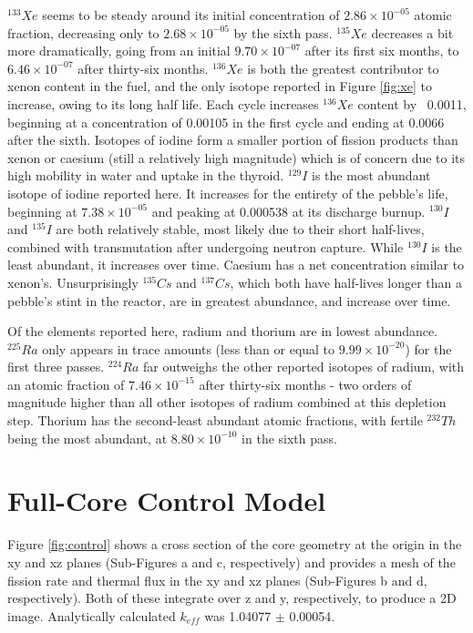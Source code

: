 $^{133}Xe$ seems to be steady around its initial concentration of $2.86\times10^{-05}$ atomic fraction, decreasing only to $2.68\times10^{-05}$ by the sixth pass.  $^{135}Xe$ decreases a bit more dramatically, going from an initial $9.70\times10^{-07}$ after its first six months, to  $6.46\times10^{-07}$ after thirty-six months.  $^{136}Xe$ is both the greatest contributor to xenon content in the fuel, and the only isotope reported in  Figure \ref{fig:xe} to increase, owing to its long half life.  Each cycle increases $^{136}Xe$ content by ~0.0011, beginning at a concentration of 0.00105 in the first cycle and ending at 0.0066 after the sixth.  Isotopes of iodine form a smaller portion of fission products than xenon or caesium (still a relatively high magnitude) which is of concern due to its high mobility in water and uptake in the thyroid.  $^{129}I$ is the most abundant isotope of iodine reported here.  It increases for the entirety of the pebble's life, beginning at $7.38\times10^{-05}$ and peaking at 0.000538 at its discharge burnup.  $^{130}I$ and $^{135}I$ are both relatively stable, most likely due to their short half-lives, combined with transmutation after undergoing neutron capture.  While $^{130}I$ is the least abundant, it increases over time.  Caesium has a net concentration similar to xenon's.  Unsurprisingly $^{135}Cs$ and $^{137}Cs$, which both have half-lives longer than a pebble's stint in the reactor, are in greatest abundance, and increase over time.

Of the elements reported here, radium and thorium are in lowest abundance.  $^{225}Ra$ only appears in trace amounts (less than or equal to $9.99\times10^{-20}$) for the first three passes.  $^{224}Ra$ far outweighs the other reported isotopes of radium, with an atomic fraction of $7.46\times10^{-15}$ after thirty-six months - two orders of magnitude higher than all other isotopes of radium combined at this depletion step.  Thorium has the second-least abundant atomic fractions, with fertile $^{232}Th$ being the most abundant, at $8.80\times10^{-10}$ in the sixth pass.

\section{Full-Core Control Model}

Figure \ref{fig:control} shows a cross section of the core geometry at the origin in the xy and xz planes (Sub-Figures a and c, respectively) and provides a mesh of the fission rate and thermal flux in the xy and xz planes (Sub-Figures b and d, respectively).  Both of these integrate over z and y, respectively, to produce a 2D image.  Analytically calculated $k_{eff}$ was 1.04077 $\pm$ 0.00054.


